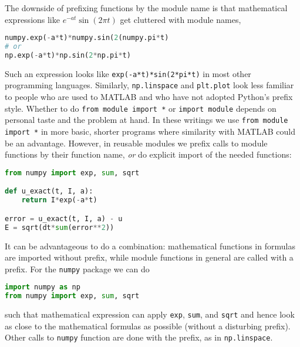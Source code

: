 \documentclass[graybox,sectrefs,envcountresetchap,open=right,final]{svmonodo}
\newenvironment{notice_mdfboxadmon}[1][]{
\begin{notice_mdfboxmdframed}[frametitle=#1]
}
{
\end{notice_mdfboxmdframed}
}
\begin{document}
The downside of prefixing functions by the module name is that
mathematical expressions like $e^{-at}\sin(2\pi t)$ get
cluttered with module names,




\begin{lstlisting}[language=python,style=blue1_bluegreen]
numpy.exp(-a*t)*numpy.sin(2(numpy.pi*t)
# or
np.exp(-a*t)*np.sin(2*np.pi*t)

\end{lstlisting}

Such an expression looks like \texttt{exp(-a*t)*sin(2*pi*t)} in most other
programming languages. Similarly, \texttt{np.linspace} and \texttt{plt.plot} look
less familiar to people who are used to MATLAB and who have not
adopted Python's prefix style.  Whether to do \texttt{from module import *}
or \texttt{import module} depends on personal taste and the problem at
hand. In these writings we use \texttt{from module import *} in more basic,
shorter programs where similarity with MATLAB could be an
advantage. However, in reusable modules we prefix calls to module
functions by their function name, \emph{or} do explicit import of the
needed functions:









\begin{lstlisting}[language=python,style=blue1_bluegreen]
from numpy import exp, sum, sqrt

def u_exact(t, I, a):
    return I*exp(-a*t)

error = u_exact(t, I, a) - u
E = sqrt(dt*sum(error**2))

\end{lstlisting}



\begin{notice_mdfboxadmon}
It can be advantageous to do a combination: mathematical functions
in formulas are imported without prefix, while module functions
in general are called with a prefix. For the \texttt{numpy} package we
can do




\begin{lstlisting}[language=Python,style=gray]
import numpy as np
from numpy import exp, sum, sqrt

\end{lstlisting}

such that mathematical expression can apply \texttt{exp}, \texttt{sum}, and \texttt{sqrt}
and hence look as close to the mathematical formulas as possible
(without a disturbing prefix).
Other calls to \texttt{numpy} function are done with the prefix, as in
\texttt{np.linspace}.
\end{notice_mdfboxadmon} %
\end{document}
